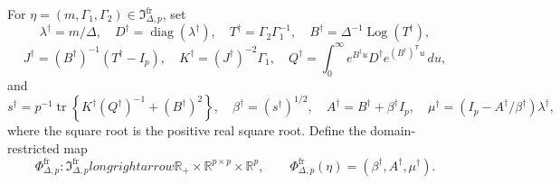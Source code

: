 For \(\eta=(m,\Gamma_1,\Gamma_2)\in\mathfrak I_{\Delta,p}^{\mathrm{fr}}\), set
\[
 \lambda^\dagger=m/\Delta,\quad D^\dagger=\operatorname{diag}(\lambda^\dagger),\quad
 T^\dagger=\Gamma_2\Gamma_1^{-1},\quad
 B^\dagger=\Delta^{-1}\operatorname{Log}(T^\dagger),
\]
\[
 J^\dagger=(B^\dagger)^{-1}(T^\dagger-I_p),\quad
 K^\dagger=(J^\dagger)^{-2}\Gamma_1,\quad
 Q^\dagger=\int_0^\infty e^{B^\dagger u}D^\dagger e^{(B^\dagger)^{\mathsf T}u}\,du,
\]
and
\[
 s^\dagger=p^{-1}\operatorname{tr}\!\left\{K^\dagger(Q^\dagger)^{-1}+(B^\dagger)^2\right\},\quad
 \beta^\dagger=(s^\dagger)^{1/2},\quad
 A^\dagger=B^\dagger+\beta^\dagger I_p,\quad
 \mu^\dagger=(I_p-A^\dagger/\beta^\dagger)\lambda^\dagger,
\]
where the square root is the positive real square root. Define the domain-restricted map
\[
 \Phi^{\mathrm{fr}}_{\Delta,p}:\mathfrak I_{\Delta,p}^{\mathrm{fr}}longrightarrow
 \mathbb R_+\times\mathbb R^{p\times p}\times\mathbb R^p,
 \qquad
 \Phi^{\mathrm{fr}}_{\Delta,p}(\eta)=(\beta^\dagger,A^\dagger,\mu^\dagger).
\]